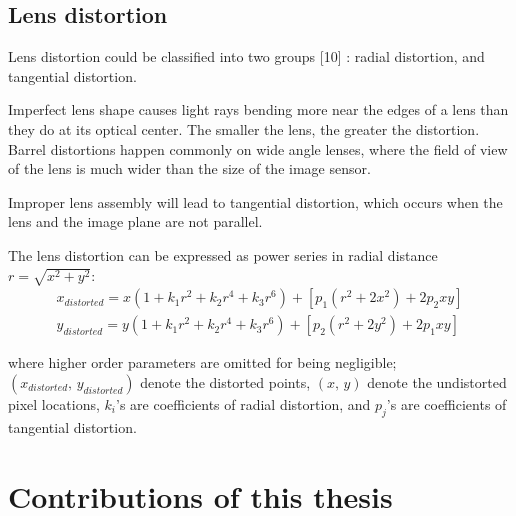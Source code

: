 \subsection{Lens distortion}
Lens distortion could be classified into two groups [10] : radial distortion, and tangential distortion.\par
%
Imperfect lens shape causes light rays bending more near the edges of a lens than they do at its optical center. The smaller the lens, the greater the distortion. Barrel distortions happen commonly on wide angle lenses, where the field of view of the lens is much wider than the size of the image sensor.\par%
Improper lens assembly will lead to tangential distortion, which occurs when the lens and the image plane are not parallel.\\\par
%
The lens distortion can be expressed as power series in radial distance \(r = \sqrt{x^2 + y^2}\):
\begin{equation}
%
\begin{aligned}
x_{distorted} =  x (1 + k_1 r^2 + k_2 r^4 + k_3 r^6) + [p_1 (r^2 + 2 x^2) + 2 p_2 xy] %
\\%
y_{distorted} =  y (1 + k_1 r^2 + k_2 r^4 + k_3 r^6) + [p_2 (r^2 + 2 y^2) + 2 p_1 xy]
\end{aligned}
\label{lensDistortion}
%
\end{equation}%

where higher order parameters are omitted for being negligible; \((x_{distorted}, \, y_{distorted})\) denote the distorted points, \((x, \, y)\) denote the undistorted pixel locations, \(k_i\)'s are coefficients of radial distortion, and \(p_j\)'s are coefficients of tangential distortion.\par
%
\section{Contributions of this thesis}

